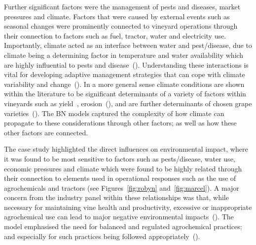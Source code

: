 \documentclass[10pt,letterpaper]{article}
\begin{document}
Further significant factors were the management of pests and diseases, market pressures and climate. Factors that were caused by external events such as seasonal changes were prominently connected to vineyard operations through their connection to factors such as fuel, tractor, water and electricity use. Importantly, climate acted as an interface between water and pest/disease, due to climate being a determining factor in temperature and water availability which are highly influential to pests and disease~(\cite{boisClimateVsGrapevine2017}). Understanding these interactions is vital for developing adaptive management strategies that can cope with climate variability and change~(\cite{agostaRegionalClimateVariability2012,alsafadiFutureScenariosBioclimatic2023,barriguinhaVineyardYieldEstimation2021,sharmaChapterImpactClimate2014}). In a more general sense climate conditions are shown within the literature to be significant determinants of a variety of factors within vineyards such as yield~\cite{barriguinhaVineyardYieldEstimation2021,antonComparativeStudyRisk2012}, erosion~(\cite{biddoccuEvaluationSoilErosion2020,doi:10.1177/0309133319861833}), and are further determinants of chosen grape varieties~(\cite{topferGrapeVarietiesAre2022, petriashviliImpactClimateChange2023}). The BN models captured the complexity of how climate can propagate to these considerations through other factors; as well as how these other factors are connected.

The case study highlighted the direct influences on environmental impact, where it was found to be most sensitive to factors such as pests/disease, water use, economic pressures and climate which were found to be highly related through their connection to elements used in operational responses such as the use of agrochemicals and tractors (see Figures~\ref{fig:robyn} and~\ref{fig:marcel}). A major concern from the industry panel within these relationships was that, while necessary for maintaining vine health and productivity, excessive or inappropriate agrochemical use can lead to major negative environmental impacts~(\cite{alonsogonzalezUnveilingTerroirEvaluating2024,manjarres-lopezAssessmentPesticideResidues2021}). The model emphasised the need for balanced and regulated agrochemical practices; and especially for such practices being followed appropriately~(\cite{baianoOverviewSustainabilityWine2021}).

\end{document}
